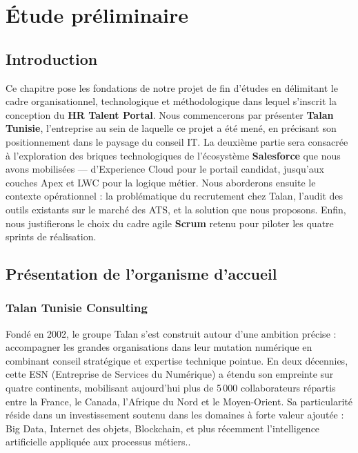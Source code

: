 \chapter{Étude préliminaire}
\label{chap:etude_preliminaire}

\section{Introduction}

Ce chapitre pose les fondations de notre projet de fin d'études en délimitant le cadre organisationnel, technologique et méthodologique dans lequel s'inscrit la conception du \textbf{HR Talent Portal}. Nous commencerons par présenter \textbf{Talan Tunisie}, l'entreprise au sein de laquelle ce projet a été mené, en précisant son positionnement dans le paysage du conseil IT. La deuxième partie sera consacrée à l'exploration des briques technologiques de l'écosystème \textbf{Salesforce} que nous avons mobilisées --- d'Experience Cloud pour le portail candidat, jusqu'aux couches Apex et LWC pour la logique métier. Nous aborderons ensuite le contexte opérationnel : la problématique du recrutement chez Talan, l'audit des outils existants sur le marché des ATS, et la solution que nous proposons. Enfin, nous justifierons le choix du cadre agile \textbf{Scrum} retenu pour piloter les quatre sprints de réalisation.

\section{Présentation de l'organisme d'accueil}
\subsection{Talan Tunisie Consulting}

Fondé en 2002, le groupe Talan s'est construit autour d'une ambition précise : accompagner les grandes organisations dans leur mutation numérique en combinant conseil stratégique et expertise technique pointue. En deux décennies, cette ESN (Entreprise de Services du Numérique) a étendu son empreinte sur quatre continents, mobilisant aujourd'hui plus de 5\,000 collaborateurs répartis entre la France, le Canada, l'Afrique du Nord et le Moyen-Orient. Sa particularité réside dans un investissement soutenu dans les domaines à forte valeur ajoutée : Big Data, Internet des objets, Blockchain, et plus récemment l'intelligence artificielle appliquée aux processus métiers.\parencite{URL1}.

